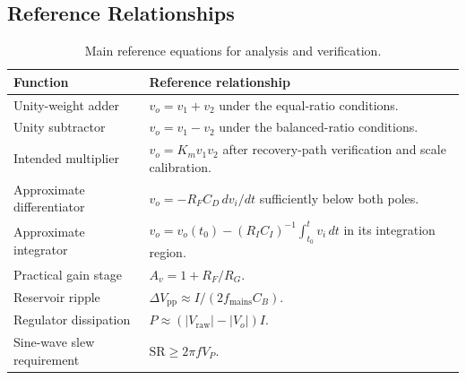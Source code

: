 \documentclass[11pt,a4paper]{article}
\begin{document}
\subsection{Reference Relationships}
\begin{table}[H]
\centering\small
\caption{Main reference equations for analysis and verification.}
\begin{tabularx}{\textwidth}{P{0.30\textwidth}Y}
\toprule\textbf{Function} & \textbf{Reference relationship}\\\midrule
Unity-weight adder & $v_o=v_1+v_2$ under the equal-ratio conditions.\\
Unity subtractor & $v_o=v_1-v_2$ under the balanced-ratio conditions.\\
Intended multiplier & $v_o=K_m v_1v_2$ after recovery-path verification and scale calibration.\\
Approximate differentiator & $v_o=-R_FC_D\,dv_i/dt$ sufficiently below both poles.\\
Approximate integrator & $v_o=v_o(t_0)-(R_IC_I)^{-1}\int_{t_0}^t v_i\,dt$ in its integration region.\\
Practical gain stage & $A_v=1+R_F/R_G$.\\
Reservoir ripple & $\Delta V_{\mathrm{pp}}\approx I/(2f_{\mathrm{mains}}C_B)$.\\
Regulator dissipation & $P\approx(|V_{\mathrm{raw}}|-|V_o|)I$.\\
Sine-wave slew requirement & $\mathrm{SR}\geq2\pi fV_P$.\\
\bottomrule
\end{tabularx}
\end{table}
\end{document}
